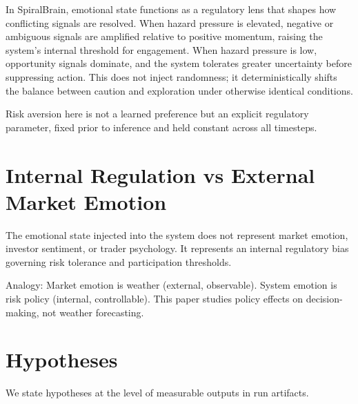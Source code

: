 \documentclass[12pt,a4paper]{report}
\begin{document}
In SpiralBrain, emotional state functions as a regulatory lens that shapes how conflicting signals are resolved. When hazard pressure is elevated, negative or ambiguous signals are amplified relative to positive momentum, raising the system's internal threshold for engagement. When hazard pressure is low, opportunity signals dominate, and the system tolerates greater uncertainty before suppressing action. This does not inject randomness; it deterministically shifts the balance between caution and exploration under otherwise identical conditions.

Risk aversion here is not a learned preference but an explicit regulatory parameter, fixed prior to inference and held constant across all timesteps.

\section{Internal Regulation vs External Market Emotion}

The emotional state injected into the system does not represent market emotion, investor sentiment, or trader psychology. It represents an internal regulatory bias governing risk tolerance and participation thresholds.

Analogy: Market emotion is weather (external, observable). System emotion is risk policy (internal, controllable). This paper studies policy effects on decision-making, not weather forecasting.

\section{Hypotheses}

We state hypotheses at the level of measurable outputs in run artifacts.
\end{document}
